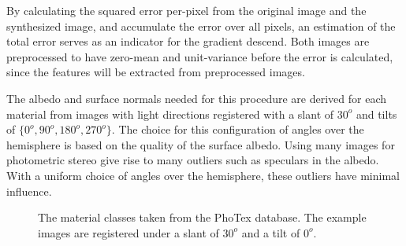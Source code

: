 By calculating the squared error per-pixel from the original image and the synthesized image, and accumulate the error over all pixels, an estimation of the total error serves as an indicator for the gradient descend. Both images are preprocessed to have zero-mean and unit-variance before the error is calculated, since the features will be extracted from preprocessed images.

The albedo and surface normals needed for this procedure are derived for each material from images with light directions registered with a slant of $30^o$ and tilts of $\{0^o, 90^o, 180^o, 270^o\}$. The choice for this configuration of angles over the hemisphere is based on the quality of the surface albedo. Using many images for photometric stereo give rise to many outliers such as speculars in the albedo. With a uniform choice of angles over the hemisphere, these outliers have minimal influence.

\begin{figure}[H]
	\begin{center}



	\end{center}
	\caption{The material classes taken from the PhoTex database. The example images are registered under a slant of $30^o$ and a tilt of $0^o$.}
	\label{fig:PhoTexData}
\end{figure}


